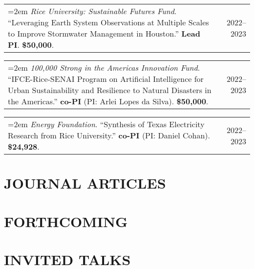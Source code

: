 \documentclass[10pt,oneside]{article}
\makeatletter
\newenvironment{alignedentrieshang}[1][2em]{%
  \noindent%
}{%
}
\newcommand{\hangingitem}[2]{%
  \noindent%
  \begin{tabular*}{\textwidth}{@{}p{0.85\textwidth}@{\extracolsep{\fill}}r@{}}%
    \hangindent=2em \hangafter=1 #1 & #2%
  \end{tabular*}%
}
\makeatother
\begin{document}
\begin{alignedentrieshang}
\hangingitem{\textit{Rice University}\textit{: Sustainable Futures Fund}. ``Leveraging Earth System Observations at Multiple Scales to Improve Stormwater Management in Houston.'' \textbf{Lead PI}. \textbf{\$50,000}.}{2022--2023}

\hangingitem{\textit{100,000 Strong in the Americas Innovation Fund}. ``IFCE-Rice-SENAI Program on Artificial Intelligence for Urban Sustainability and Resilience to Natural Disasters in the Americas.'' \textbf{co-PI} (PI: Arlei Lopes da Silva). \textbf{\$50,000}.}{2022--2023}

\hangingitem{\textit{Energy Foundation}. ``Synthesis of Texas Electricity Research from Rice University.'' \textbf{co-PI} (PI: Daniel Cohan). \textbf{\$24,928}.}{2022--2023}

\end{alignedentrieshang}


\section{JOURNAL ARTICLES}

\printbibliography[heading=none, type=article]

\section{FORTHCOMING}

\printbibliography[filter=ispreprint, heading=none]


\section{INVITED TALKS}
\end{document}
